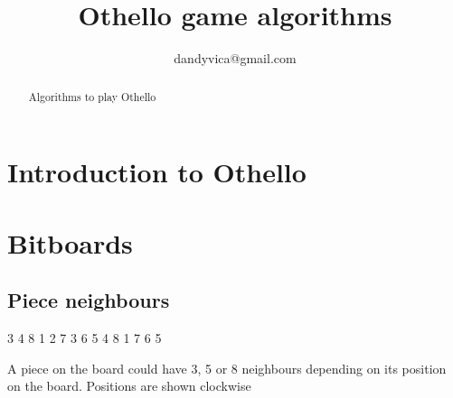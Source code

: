 \documentclass{article}
\begin{document}
\title{Othello game algorithms}
\author{dandyvica@gmail.com}

\maketitle

\begin{abstract}
Algorithms to play Othello
\end{abstract}

\section{Introduction to Othello}

\begin{othelloboard}{0.75}
\end{othelloboard}

\section{Bitboards}
\subsection{Piece neighbours}

\begin{center}
    \begin{minipage}[c]{0.4\textwidth}
        \begin{othelloboardnorefs}{0.75}

            \annotationsfirstrow   {} {3} {} {} {} {} {} {}
             {4} {} {} {} {} {} {}
            \annotationsthirdrow   {} {} {8} {1} {2} {} {} {}
            \annotationsfourthrow  {} {} {7} {} {3} {} {} {}
            \annotationsfifthrow   {} {} {6} {5} {4} {} {} {}
            \annotationssixthrow   {} {} {} {} {} {} {8} {1}
            \annotationsseventhrow {} {} {} {} {} {} {7} {}
            \annotationseighthrow {} {} {} {} {} {} {6} {5}
        \end{othelloboardnorefs}
    \end{minipage}
    \hfill
    \begin{minipage}[c]{0.5\textwidth}
        A piece on the board could have 3, 5 or 8 neighbours depending on its position on the board.
        Positions are shown clockwise
    \end{minipage}
\end{center}
\end{document}
